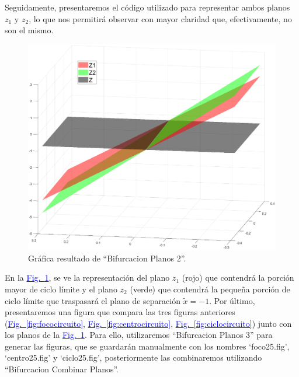 \documentclass[12pt,a4paper]{report} %
\newcommand{\fref}[1]{\hyperref[#1]{\textcolor{blue}{Fig.~\ref*{#1}}}}
\begin{document}
	\vspace{0.5cm}Seguidamente, presentaremos el código utilizado para representar ambos planos $z_1$ y $z_2$, lo que nos permitirá observar con mayor claridad que, efectivamente, no son el mismo.
	
	\vspace{0.5cm}
	
	\newpage
	
	\begin{figure}[h]
		\centering
		\includegraphics[width=1\textwidth]{planoscircuito.eps}
		\caption{Gráfica resultado de ``Bifurcacion Planos 2''.}
		\label{fig:planoscircuito}
	\end{figure}\smallskip
	
	\vspace{0.5cm} En la \fref{fig:planoscircuito}, se ve la representación del plano $z_1$ (rojo) que contendrá la porción mayor de ciclo límite y el plano $z_2$ (verde) que contendrá la pequeña porción de ciclo límite que traspasará el plano de separación $\tilde{x}=-1$. Por último, presentaremos una figura que compara las tres figuras anteriores (\fref{fig:fococircuito}, \fref{fig:centrocircuito}, \fref{fig:ciclocircuito}) junto con los planos de la \fref{fig:planoscircuito}. Para ello, utilizaremos ``Bifurcacion Planos 3'' para generar las figuras, que se guardarán manualmente con los nombres `foco25.fig', `centro25.fig' y `ciclo25.fig', posteriormente las combinaremos utilizando ``Bifurcacion Combinar Planos''.
	\newpage
	
\end{document}
